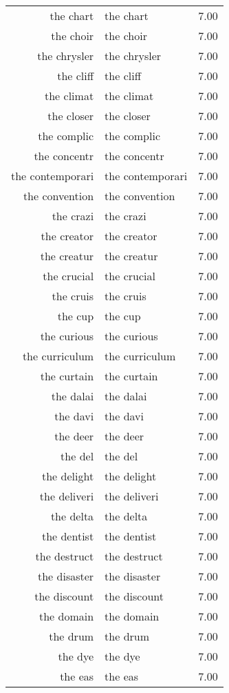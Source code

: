 \begin{table}[ht]
\begin{tabular}{rlr}
  the chart & the chart & 7.00 \\ 
  the choir & the choir & 7.00 \\ 
  the chrysler & the chrysler & 7.00 \\ 
  the cliff & the cliff & 7.00 \\ 
  the climat & the climat & 7.00 \\ 
  the closer & the closer & 7.00 \\ 
  the complic & the complic & 7.00 \\ 
  the concentr & the concentr & 7.00 \\ 
  the contemporari & the contemporari & 7.00 \\ 
  the convention & the convention & 7.00 \\ 
  the crazi & the crazi & 7.00 \\ 
  the creator & the creator & 7.00 \\ 
  the creatur & the creatur & 7.00 \\ 
  the crucial & the crucial & 7.00 \\ 
  the cruis & the cruis & 7.00 \\ 
  the cup & the cup & 7.00 \\ 
  the curious & the curious & 7.00 \\ 
  the curriculum & the curriculum & 7.00 \\ 
  the curtain & the curtain & 7.00 \\ 
  the dalai & the dalai & 7.00 \\ 
  the davi & the davi & 7.00 \\ 
  the deer & the deer & 7.00 \\ 
  the del & the del & 7.00 \\ 
  the delight & the delight & 7.00 \\ 
  the deliveri & the deliveri & 7.00 \\ 
  the delta & the delta & 7.00 \\ 
  the dentist & the dentist & 7.00 \\ 
  the destruct & the destruct & 7.00 \\ 
  the disaster & the disaster & 7.00 \\ 
  the discount & the discount & 7.00 \\ 
  the domain & the domain & 7.00 \\ 
  the drum & the drum & 7.00 \\ 
  the dye & the dye & 7.00 \\ 
  the eas & the eas & 7.00 \\ 

\end{tabular}
\end{table}
